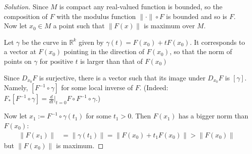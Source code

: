 \begin{proof}[Solution]\leavevmode
	Since \(M\) is compact any real-valued function is bounded, so the composition of \(F\) with the modulus function \(\|\cdot\| \circ F\) is bounded and so is \(F\). Now let \(x_0 \in M\) a point such that \(\|F(x)\|\) is maximum over \(M\).

Let \(\gamma\) be the curve in \(\mathbb{R}^k\) given by \(\gamma(t)=F(x_0)+tF(x_0)\). It corresponds to a vector at \(F(x_0)\) pointing in the direction of \(F(x_0)\), so that the norm of points on \(\gamma\) for positive \(t\) is larger than that of \(F(x_0)\)

Since \(D_{x_0}F\) is surjective, there is a vector such that its image under \(D_{x_0}F\) is \([\gamma]\). Namely, \([F^{-1}\circ \gamma]\) for some local inverse of \(F\). (Indeed: \(F_*[F^{-1}\circ \gamma]=\frac{d}{dt}\Big|_{t=0}F \circ F^{-1} \circ \gamma\).)

Now let \(x_1:=F^{-1} \circ \gamma(t_1)\) for some \(t_1>0\). Then \(F(x_1)\) has a bigger norm than \(F(x_0)\):
\begin{align*}
\|F(x_1)\|&=\|\gamma(t_1)\|=\|F(x_0)+t_1F(x_0)\|>\|F(x_0)\|
\end{align*}
but \(\|F(x_0)\|\) is maximum.
\end{proof}





